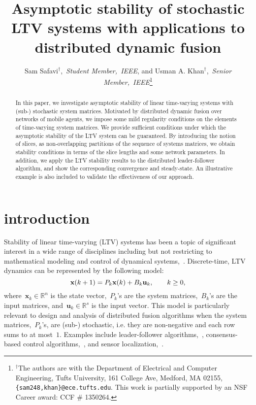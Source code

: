 \documentclass[draftclsnofoot, onecolumn, 12pt]{IEEEtran}
\def\mb{\mathbf}
\def\mbb{\mathbb}
\begin{document}
\title{Asymptotic stability of stochastic LTV systems with applications to distributed dynamic fusion}
\author{Sam Safavi$^\dagger$,~\emph{Student Member,~IEEE}, and Usman A. Khan$^\dagger$,~\emph{Senior Member,~IEEE}\thanks{$^\dagger$The authors are with the Department of Electrical and Computer Engineering, Tufts University, 161 College Ave, Medford, MA 02155, {\texttt{\{sam248,khan\}@ece.tufts.edu}}. This work is partially supported by an NSF Career award: CCF \# 1350264.}}
\maketitle
\thispagestyle{empty}

\begin{abstract}
In this paper, we investigate asymptotic stability of linear time-varying  systems with (sub-) stochastic system matrices. Motivated by distributed dynamic fusion over networks of mobile agents, we impose some mild regularity conditions on the elements of time-varying system matrices. We provide sufficient conditions under which the asymptotic stability of the LTV system can be guaranteed. By introducing the notion of slices, as non-overlapping partitions of the sequence of systems matrices, we obtain stability conditions in terms of the slice lengths and some network parameters. In addition, we apply the LTV stability results to the distributed leader-follower algorithm, and show the corresponding convergence and steady-state. An illustrative example is also included to validate the effectiveness of our approach.
\end{abstract}

\section{introduction}\label{intro}
Stability of linear time-varying (LTV) systems has been a topic of significant interest in a wide range of disciplines including but not restricting to mathematical modeling and control of dynamical systems,~\cite{rosenbrook1963stability,1100529,1084637,Ilchmann1987157,tsakalis1993linear,DaCunha2005381,Phat2006343}. Discrete-time, LTV dynamics can be represented by the following model:
\begin{equation}\label{1}
{\bf{x}}(k+1)={{P}}_k{\bf{x}}(k)+B_k\mb{u}_k,\qquad k \geq 0,
\end{equation}
where~$\mb{x}_k\in\mbb{R}^n$ is the state vector,~$P_k$'s are the system matrices,~$B_k$'s are the input matrices, and~$\mb{u}_k\in\mbb{R}^s$ is the input vector. This model is particularly relevant to design and analysis of distributed fusion algorithms when the system matrices,~$P_k$'s, are (sub-) stochastic, i.e. they are non-negative and each row sums to at most~$1$. Examples include leader-follower algorithms,~\cite{tanner02,4200874}, consensus-based control algorithms,~\cite{5509836,5456181,4456762}, and sensor localization,~\cite{khan2009distributed,khan2010diland}. 
\end{document}
